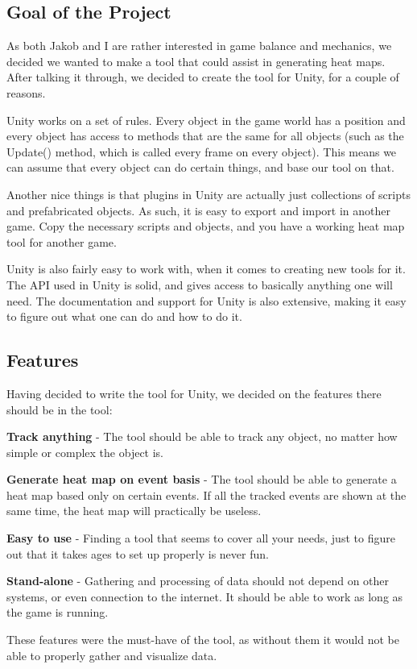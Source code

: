 \subsection{Goal of the Project}
\label{Project_Goal}

As both Jakob and I are rather interested in game balance and mechanics, we decided we wanted to make a tool that could assist in generating heat maps. After talking it through, we decided to create the tool for Unity, for a couple of reasons.

Unity works on a set of rules. Every object in the game world has a position and every object has access to methods that are the same for all objects (such as the Update() method, which is called every frame on every object). This means we can assume that every object can do certain things, and base our tool on that.

Another nice things is that plugins in Unity are actually just collections of scripts and prefabricated objects. As such, it is easy to export and import in another game. Copy the necessary scripts and objects, and you have a working heat map tool for another game.

Unity is also fairly easy to work with, when it comes to creating new tools for it. The API used in Unity is solid, and gives access to basically anything one will need. The documentation and support for Unity is also extensive, making it easy to figure out what one can do and how to do it.

\subsection{Features}
\label{Project_Features}

Having decided to write the tool for Unity, we decided on the features there should be in the tool:

\begin{my_itemize}

	\item \textbf{Track anything} - The tool should be able to track any object, no matter how simple or complex the object is.

	\item \textbf{Generate heat map on event basis} - The tool should be able to generate a heat map based only on certain events. If all the tracked events are shown at the same time, the heat map will practically be useless.

	\item \textbf{Easy to use} - Finding a tool that seems to cover all your needs, just to figure out that it takes ages to set up properly is never fun.

	\item \textbf{Stand-alone} - Gathering and processing of data should not depend on other systems, or even connection to the internet. It should be able to work as long as the game is running.

\end{my_itemize}

These features were the must-have of the tool, as without them it would not be able to properly gather and visualize data. 